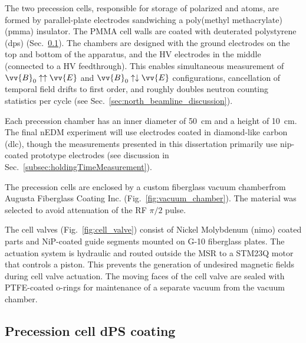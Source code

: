 The two precession cells, responsible for storage of polarized \ucn and \hg atoms, are formed by parallel-plate electrodes sandwiching a poly(methyl methacrylate) (\acrshort*{pmma}) insulator. The PMMA cell walls are coated with deuterated polystyrene (\acrshort*{dps}) (Sec.~\ref{sec:dPS_coating}). The chambers are designed with the ground electrodes on the top and bottom of the apparatus, and the HV electrodes in the middle (connected to a HV feedthrough). This enables simultaneous measurement of $\vv{B}_0\uparrow\uparrow\vv{E}$ and $\vv{B}_0\uparrow\downarrow\vv{E}$ configurations, cancellation of temporal field drifts to first order, and roughly doubles neutron counting statistics per cycle (see Sec.~\ref{sec:north_beamline_discussion}).

Each precession chamber has an inner diameter of \qty{50}{cm} and a height of \qty{10}{cm}. The final nEDM experiment will use electrodes coated in diamond-like carbon (\acrshort*{dlc}), though the measurements presented in this dissertation primarily use \acrshort{nip}-coated prototype electrodes (see discussion in Sec.~\ref{subsec:holdingTimeMeasurement}).

The precession cells are enclosed by a custom fiberglass vacuum chamberfrom Augusta Fiberglass Coating Inc. (Fig.~\ref{fig:vacuum_chamber}). The material was selected to avoid attenuation of the RF $\pi/2$ pulse.

The cell valves (Fig.~\ref{fig:cell_valve}) consist of Nickel Molybdenum (\acrshort*{nimo}) coated parts and NiP-coated guide segments mounted on G-10 fiberglass plates. The actuation system is hydraulic and routed outside the MSR to a STM23Q motor that controls a piston. This prevents the generation of undesired magnetic fields during cell valve actuation. The moving faces of the cell valve are sealed with PTFE-coated o-rings for maintenance of a separate vacuum from the vacuum chamber.


\subsection{Precession cell dPS coating}\label{sec:dPS_coating}


